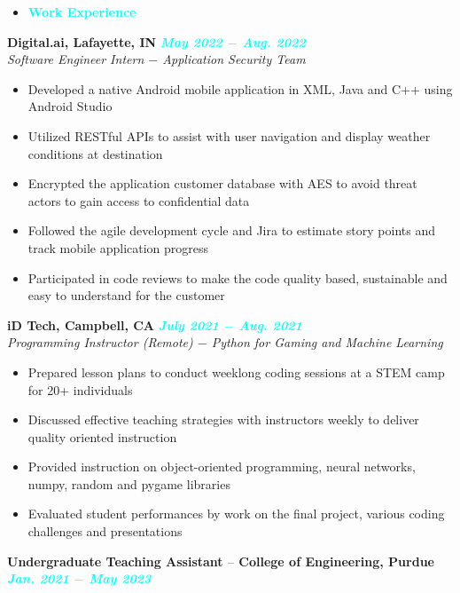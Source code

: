 \documentclass{article}
\begin{document}
\begin{itemize}[noitemsep, nolistsep, leftmargin = *]
    \item[\textcolor{cyan}{\ding{228}}]\Large{\textcolor{cyan}{\textbf{Work Experience}}}
    \hrulefill
\end{itemize}
\textbf{Digital.ai, Lafayette, IN} \hfill \textit{\textcolor{cyan}{\textbf{May 2022 $-$ Aug. 2022}}} \\
\textit{Software Engineer Intern $-$ Application Security Team} 
\begin{itemize}[noitemsep, nolistsep]
    \item Developed a native Android mobile application in XML, Java and C++ using Android Studio 
    \item Utilized RESTful APIs to assist with user navigation and display weather conditions at destination
    \item Encrypted the application customer database with AES to avoid threat actors to gain access to confidential data
    \item Followed the agile development cycle and Jira to estimate story points and track mobile application progress
    \item Participated in code reviews to make the code quality based, sustainable and easy to understand for the customer \\
\end{itemize}
\textbf{iD Tech, Campbell, CA} \hfill \textit{\textcolor{cyan}{\textbf{July 2021 $-$ Aug. 2021}}} \\
\textit{Programming Instructor (Remote) $-$ Python for Gaming and Machine Learning}
\begin{itemize}[noitemsep, nolistsep]
    \item Prepared lesson plans to conduct weeklong coding sessions at a STEM camp for 20+ individuals
    \item Discussed effective teaching strategies with instructors weekly to deliver quality oriented instruction
    \item Provided instruction on object-oriented programming, neural networks, numpy, random and pygame libraries 
    \item Evaluated student performances by work on the final project, various coding challenges and presentations \\
\end{itemize}
\textbf{Undergraduate Teaching Assistant $–$ College of Engineering, Purdue} \hfill \textit{\textcolor{cyan}{\textbf{Jan. 2021 $-$ May 2023}}} \\
\end{document}
